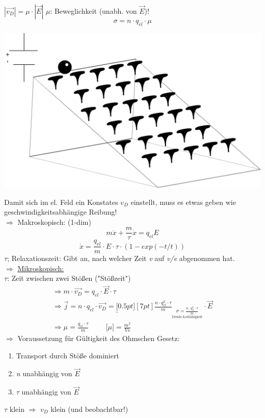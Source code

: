 \documentclass[11pt]{article}
\begin{document}
		$ |\vec{v_D}|=\mu \cdot |\vec{E}| $ \hspace{1cm} $ \mu $: Beweglichkeit (unabh. von $ \vec{E} $)! \\
		$$ \boxed{\sigma = n\cdot q_{el} \cdot \mu  } $$
		\begin{center}
			\includegraphics[width=0.5\linewidth]{skizzen/15/VL06/15_7}
		\end{center}
		Damit sich im el. Feld ein Konstates $ v_D $ einstellt, muss es etwas geben wie geschwindigkeitsabhängige Reibung! \\
		$ \Rightarrow $ Makroskopisch: (1-dim) \\
		$$ m\ddot{x}+\frac{m}{\tau}\dot{x} = q_{el}E$$
		$$\boxed{\dot{x} =\frac{q_{el}}{m} \cdot E \cdot \tau \cdot (1-exp(-t/t))}$$
		$ \tau $; Relaxationszeit: Gibt an, nach welcher Zeit \emph{v} auf \emph{v/e} abgenommen hat. \\
		$ \Rightarrow $ \underline{Mikroskopisch:} \\
		$ \tau $: Zeit zwischen zwei Stößen ("Stößzeit") \\
		
		\begin{align*}
		\Rightarrow m \cdot \vec{v_D} = q_{el} \cdot \vec{E} \cdot \tau \\
		\Rightarrow \vec{j} = n\cdot q_{el} \cdot \vec{v_D} = \underbracket[0.5pt][7pt]{\frac{n \cdot q_{el}^2 \cdot \tau}{m}}_{\boxed{\underset{\text{Drude-Leitfähigkeit}}{\sigma = \frac{n \cdot q_{el}^2 \cdot \tau}{m}}}} \cdot \vec{E}\\
		\Rightarrow \boxed{\mu = \frac{q_{el}\cdot \tau}{m}} \hspace{1cm} \text{[$\mu$]} = \frac{m^2}{Vs}
		\end{align*}
		$ \Rightarrow $ Voraussetzung für Gültigkeit des Ohmschen Gesetz:
		\begin{enumerate}
			\item Transport durch Stöße dominiert
			\item \emph{n} unabhängig von $ \vec{E} $
			\item $ \tau $ unabhängig von $ \vec{E} $
		\end{enumerate}
		$ \tau $ klein $\Rightarrow$ $ v_D $ klein (und beobachtbar!) 
		\newpage
				
\end{document}
